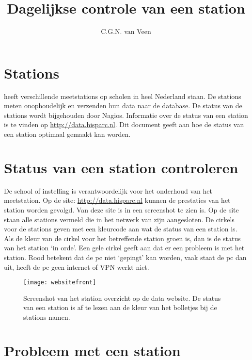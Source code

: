 



\title{Dagelijkse controle van een station} \author{C.G.N. van Veen}
\date{}

\maketitle

\section{Stations}

\hisparc heeft verschillende meetstations op scholen in heel Nederland
staan. De stations meten onophoudelijk en verzenden hun data naar de
\hisparc database. De status van de \hisparc stations wordt bijgehouden
door Nagios. Informatie over de status van een station is te vinden op
\url{http://data.hisparc.nl}. Dit document geeft aan hoe de status van
een station optimaal gemaakt kan worden.


\section{Status van een station controleren}

De school of instelling is verantwoordelijk voor het onderhoud van het
meetstation. Op de site: \url{http://data.hisparc.nl} kunnen de
prestaties van het station worden gevolgd. Van deze site is in
 een screenshot te zien is. Op de site staan alle
stations vermeld die in het netwerk van \hisparc zijn aangesloten. De
cirkels voor de stations geven met een kleurcode aan wat de status van
een station is. Als de kleur van de cirkel voor het betreffende station
groen is, dan is de status van het station `in orde'. Een gele cirkel
geeft aan dat er een probleem is met het station. Rood betekent dat de
pc niet `gepingt' kan worden, vaak staat de pc dan uit, heeft de pc geen
internet of VPN werkt niet.

\begin{figure}
    \centering \texttt{[image: websitefront]}
    \caption{Screenshot van het station overzicht op de \hisparc data
             website. De status van een station is af te lezen aan de
             kleur van het bolletjes bij de stations namen.} 
    \label{fig:frontweb}
\end{figure}


\section{Probleem met een station}

